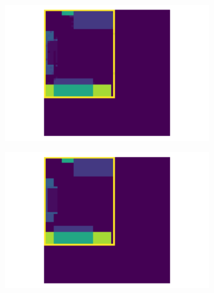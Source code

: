 \documentclass[binding=0.6cm,noexaminfo]{sapthesis}
\begin{document}
\begin{figure}[h!]
\begin{subfigure}{.49\textwidth}
	\centering
	\includegraphics[width=.90\linewidth]{results/top_pred_1}
	\caption{}
\end{subfigure}
\begin{subfigure}{.49\textwidth}
	\centering
	\includegraphics[width=.90\linewidth]{results/top_true_1}
	\caption{}
\end{subfigure}


\end{figure}
\end{document}
